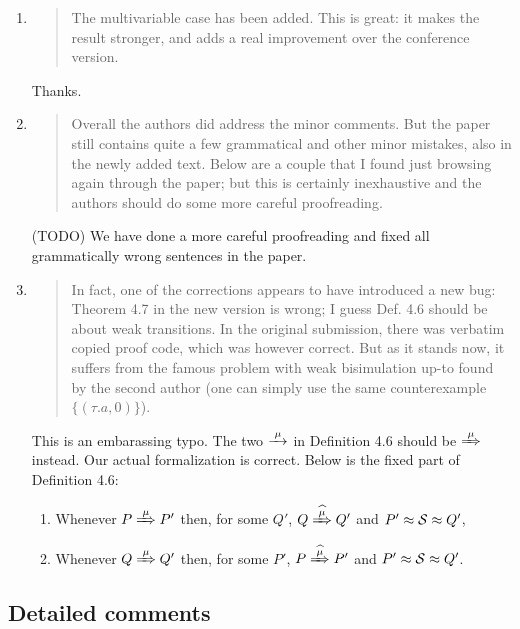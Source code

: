 \begin{enumerate}

\item \begin{quote}
    The multivariable case has been added. This is great: it makes the result stronger, and adds a real improvement over the conference version. 
  \end{quote}
  \Mark
  Thanks.

\item \begin{quote}
Overall the authors did address the minor comments. But the paper
still contains quite a few grammatical and other minor mistakes, also
in the newly added text. Below are a couple that I found just browsing
again through the paper; but this is certainly inexhaustive and the
authors should do some more careful proofreading.
\end{quote}
\Mark
(TODO) We have done a more careful proofreading and fixed all
grammatically wrong sentences in the paper.

\item \begin{quote}
    In fact, one of the corrections appears to have introduced a new
    bug: Theorem 4.7 in the new version is wrong; I guess Def. 4.6
    should be about weak transitions. In the original submission,
    there was verbatim copied proof code, which was however
    correct. But as it stands now, it suffers from the famous problem
    with weak bisimulation up-to found by the second author (one can
    simply use the same counterexample $\{(\tau. a , 0)\}$).
  \end{quote}
  \Mark
  This is an embarassing typo. The two $\arr{\mu}$ in
  Definition 4.6 should be $\Arr{\mu}$ instead. Our actual formalization is
  correct. Below is the fixed part of Definition 4.6:
\begin{enumerate}
\item Whenever $P \Arr{\mu} P'$ then, for some $Q'$, $Q \Arcap{\mu} Q'$ and $P' \approx {\cal S} \approx Q'$,
\item Whenever $Q \Arr{\mu} Q'$ then, for some $P'$, $P \Arcap{\mu} P'$ and $P' \approx {\cal S} \approx Q'$.
\end{enumerate}

\end{enumerate}

\subsection*{Detailed comments}

